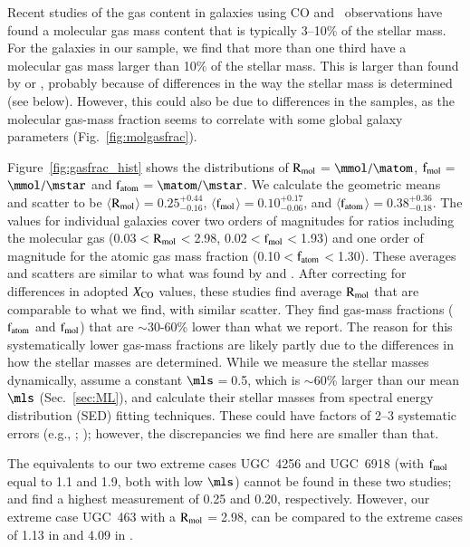 \documentclass[traditabstract]{aa} %
\begin{document}
Recent studies of the gas content in galaxies using CO and \hone\ observations 
\citep{leroy2009,saintonge2011} have found a molecular gas mass content that is typically
3--10\% of the stellar mass. For the galaxies in our sample, we find that more than one
third have a molecular gas mass larger than 10\% of the stellar mass. This is larger than
found by \cite{leroy2009} or \cite{saintonge2011}, probably because of differences in the
way the stellar mass is determined (see below). However, this could also be due to
differences in the samples, as the molecular gas-mass fraction seems to correlate with
some global galaxy parameters (Fig.~\ref{fig:molgasfrac}).

Figure~\ref{fig:gasfrac_hist} shows the distributions of $\rm R_{mol}$$=$$\mmol/\matom$, 
$\rm f_{mol}$$=$$\mmol/\mstar$ and $\rm f_{atom}$$=$$\matom/\mstar$. We calculate the 
geometric means and scatter to be $\langle$$\rm R_{mol}$$\rangle$$=$$0.25^{+0.44}_{-0.16}$,
$\langle$$\rm f_{mol}$$\rangle$$=$$0.10^{+0.17}_{-0.06}$, and 
$\langle$$\rm f_{atom}$$\rangle$$=$$0.38^{+0.36}_{-0.18}$. The values for individual
galaxies cover two orders of magnitudes for ratios including the molecular gas 
(0.03$<$$\rm R_{mol}$$<$2.98, 0.02$<$$\rm f_{mol}$$<$1.93) and one order of magnitude for
the atomic gas mass fraction (0.10$<$$\rm f_{atom}$$<$1.30). These averages
and scatters are similar to what was found by \cite{leroy2009} and \cite{saintonge2011}.
After correcting for differences in adopted $X_{\rm CO}$ values, these studies find
average $\rm R_{mol}$ that are comparable to what we find, with similar scatter. They find
gas-mass fractions ($\rm f_{atom}$ and $\rm f_{mol}$) that are $\sim$30-60\%
lower than what we report. The reason for this systematically lower gas-mass fractions are
likely partly due to the differences in how the stellar masses are determined.
While we measure the stellar masses dynamically, \cite{leroy2009} assume a
constant $\mls$$=$0.5, which is $\sim$60\% larger than our mean $\mls$
(Sec.~\ref{sec:ML}), and \cite{saintonge2011} calculate their stellar masses from
spectral energy distribution (SED) fitting techniques. These could have factors of 2--3 
systematic errors (e.g., \citealt{kauffmann2003}; ); 
however, the discrepancies we find here are smaller than that.

The equivalents to our two extreme cases UGC~4256 and UGC~6918 (with $\rm f_{mol}$ equal
to 1.1 and 1.9, both with low $\mls$) cannot be found in these two studies; 
\cite{leroy2009} and \cite{saintonge2011} find a highest measurement of 0.25 and 0.20,
respectively. However, our extreme case UGC~463 with a $\rm R_{mol}$$=$2.98, can be 
compared to the extreme cases of 1.13 in \cite{leroy2009} and 4.09 in
\cite{saintonge2011}.
\end{document}
